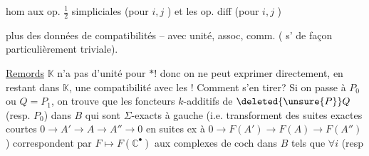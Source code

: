 hom  aux op. $\frac12$ simpliciales (pour $i,j$ ) et les op. diff (pour $i,j$ )

plus des données de compatibilités -- avec unité, assoc, comm. ( s' de façon particulièrement triviale).

\uline{Remords} $\mathbb{K}$ n'a pas d'unité pour $*$! donc  on ne peut exprimer directement, en restant dans $\mathbb{K}$, une compatibilité avec les ! Comment s'en tirer? Si on passe à $P_0$ ou $Q=P_1$,  on trouve que les foncteurs $k$-additifs de $\deleted{\unsure{P}}Q$ (resp. $P_0$) dans $B$ qui sont $\Sigma$-exacts à gauche (i.e. transforment des \inserted{$\Sigma$-}suites exactes courtes $0\longrightarrow A'\longrightarrow A\longrightarrow A''\longrightarrow0$ en suites ex à $0\longrightarrow F(A')\longrightarrow F(A)\longrightarrow F(A'')$)  correspondent par $F\longmapsto F(\mathbb{C}^{\bullet})$ aux complexes de coch dans $B$ tels que $\forall i$ (resp 
